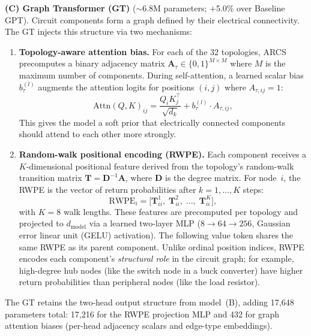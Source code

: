 \documentclass[conference]{IEEEtran}
\begin{document}
\textbf{(C) Graph Transformer (GT)} ($\sim$6.8M parameters; $+$5.0\%
over Baseline GPT). Circuit components form a graph defined by their
electrical connectivity. The GT injects this structure via
two mechanisms:
\begin{enumerate}
    \item \textbf{Topology-aware attention bias.} For each of the
    32 topologies, ARCS precomputes a binary adjacency matrix
    $\mathbf{A}_\tau \in \{0,1\}^{M \times M}$ where $M$ is the
    maximum number of components. During self-attention, a
    learned scalar bias $b_\tau^{(l)}$ augments the attention logits for
    positions $(i,j)$ where $A_{\tau,ij}=1$:
    \begin{equation}
    \text{Attn}(Q,K)_{ij} = \frac{Q_i K_j^\top}{\sqrt{d_k}} +
    b_\tau^{(l)} \cdot A_{\tau,ij},
    \label{eq:graph_attn}
    \end{equation}
    This gives the model a soft prior that electrically connected
    components should attend to each other more strongly.
    \item \textbf{Random-walk positional encoding (RWPE).} Each
    component receives a $K$-dimensional positional feature derived
    from the topology's random-walk transition matrix
    $\mathbf{T} = \mathbf{D}^{-1}\mathbf{A}$, where $\mathbf{D}$
    is the degree matrix. For node~$i$, the RWPE is the vector of
    return probabilities after $k=1,\ldots,K$ steps:
    \begin{equation}
    \text{RWPE}_i = \bigl[\mathbf{T}^1_{ii},\;
    \mathbf{T}^2_{ii},\; \ldots,\; \mathbf{T}^K_{ii}\bigr],
    \label{eq:rwpe}
    \end{equation}
    with $K\!=\!8$ walk lengths. These features are precomputed
    per topology and projected to $d_\text{model}$ via a learned
    two-layer MLP ($8 \!\to\! 64 \!\to\! 256$, Gaussian error linear
    unit (GELU) activation).
    The following value token shares the same RWPE as its parent
    component. Unlike ordinal position indices, RWPE encodes each
    component's \emph{structural role} in the circuit graph; for example,
    high-degree hub nodes (like the switch node in a buck converter)
    have higher return probabilities than peripheral nodes (like the
    load resistor).
\end{enumerate}
The GT retains the two-head output structure from
model~(B), adding 17,648 parameters total: 17,216 for the RWPE
projection MLP and 432 for graph attention biases (per-head
adjacency scalars and edge-type embeddings).
\end{document}
